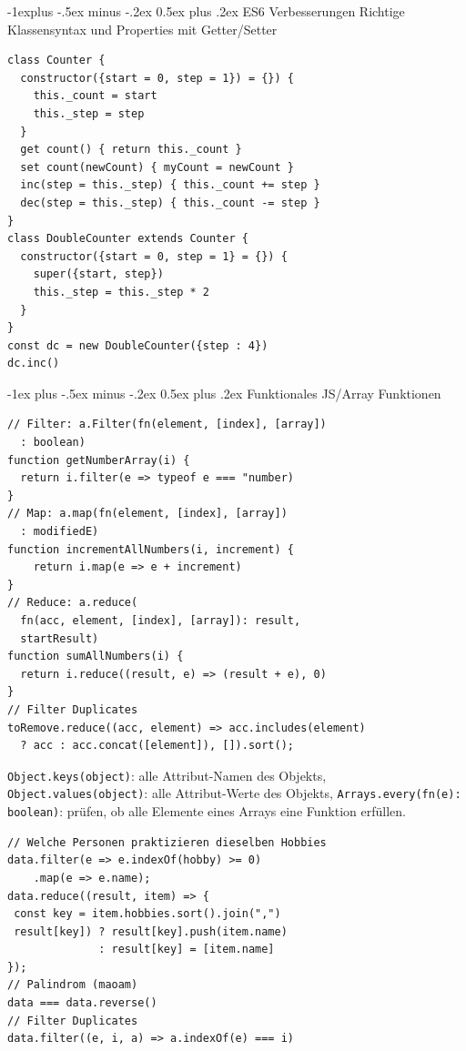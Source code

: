 \documentclass[a4paper, fontsize=6pt]{scrartcl}
\makeatletter
\renewcommand{\section}{\@startsection{section}{1}{0mm}%
    {-1ex plus -.5ex minus -.2ex}%
    {0.5ex plus .2ex}%
    {\normalfont\large\bfseries}}
\renewcommand{\subsection}{\@startsection{subsection}{2}{0mm}%
    {-1explus -.5ex minus -.2ex}%
    {0.5ex plus .2ex}%
    {\normalfont\normalsize\bfseries}}
\newcommand{\js}[1]{\texttt{#1}}
\makeatother
\begin{document}
\begin{multicols*}{5}
\subsection{ES6 Verbesserungen}
Richtige Klassensyntax und Properties mit Getter/Setter
\begin{verbatim}
class Counter {
  constructor({start = 0, step = 1}) = {}) {
    this._count = start
    this._step = step
  }
  get count() { return this._count }
  set count(newCount) { myCount = newCount }
  inc(step = this._step) { this._count += step }
  dec(step = this._step) { this._count -= step }
}
class DoubleCounter extends Counter {
  constructor({start = 0, step = 1} = {}) {
    super({start, step})
    this._step = this._step * 2
  }
}
const dc = new DoubleCounter({step : 4})
dc.inc()
\end{verbatim}


\section{Funktionales JS/Array Funktionen}
\begin{verbatim}
// Filter: a.Filter(fn(element, [index], [array])
  : boolean)
function getNumberArray(i) {
  return i.filter(e => typeof e === "number)
}
// Map: a.map(fn(element, [index], [array])
  : modifiedE)
function incrementAllNumbers(i, increment) {
    return i.map(e => e + increment)
}
// Reduce: a.reduce(
  fn(acc, element, [index], [array]): result, 
  startResult)
function sumAllNumbers(i) {
  return i.reduce((result, e) => (result + e), 0)
}
// Filter Duplicates
toRemove.reduce((acc, element) => acc.includes(element) 
  ? acc : acc.concat([element]), []).sort();

\end{verbatim}
\js{Object.keys(object)}: alle Attribut-Namen des Objekts, \js{Object.values(object)}: alle Attribut-Werte des Objekts, \js{Arrays.every(fn(e): boolean)}: prüfen, ob alle Elemente eines Arrays eine Funktion erfüllen.

\begin{verbatim}
// Welche Personen praktizieren dieselben Hobbies
data.filter(e => e.indexOf(hobby) >= 0)
    .map(e => e.name);
data.reduce((result, item) => {
 const key = item.hobbies.sort().join(",")
 result[key]) ? result[key].push(item.name) 
              : result[key] = [item.name]
});
// Palindrom (maoam)
data === data.reverse()
// Filter Duplicates
data.filter((e, i, a) => a.indexOf(e) === i)
\end{verbatim}


\end{multicols*}
\end{document}
